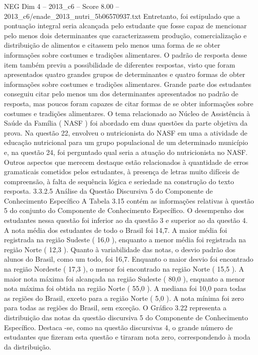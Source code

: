 \begin{textsample}{NEG Dim 4 – 2013\_c6 – Score 8.00 – 2013\_c6/enade\_2013\_nutri\_5b06570937.txt}
Entretanto, foi estipulado que a pontuação integral seria alcançada pelo estudante que fosse capaz de mencionar pelo menos dois determinantes que caracterizassem produção, comercialização e distribuição de alimentos e citassem pelo menos uma forma de se obter informações sobre costumes e tradições alimentares.
O padrão de resposta desse item também previu a possibilidade de diferentes respostas, visto que foram apresentados quatro grandes grupos de determinantes e quatro formas de obter informações sobre costumes e tradições alimentares.
Grande parte dos estudantes conseguiu citar pelo menos um dos determinantes apresentados no padrão de resposta, mas poucos foram capazes de citar formas de se obter informações sobre costumes e tradições alimentares.
O tema relacionado ao Núcleo de Assistência à Saúde da Família ( NASF ) foi abordado em duas questões da parte objetiva da prova.
Na questão 22, envolveu o nutricionista do NASF em uma a atividade de educação nutricional para um grupo populacional de um determinado município e, na questão 24, foi perguntado qual seria a atuação do nutricionista no NASF.
Outros aspectos que merecem destaque estão relacionados à quantidade de erros gramaticais cometidos pelos estudantes, à presença de letras muito difíceis de compreensão, à falta de sequência lógica e seriedade na construção do texto resposta. 3.3.2.5 Análise da Questão Discursiva 5 do Componente de Conhecimento Específico A Tabela 3.15 contém as informações relativas à questão 5 do conjunto do Componente de Conhecimento Específico.
O desempenho dos estudantes nessa questão foi inferior ao da questão 3 e superior ao da questão 4.
A nota média dos estudantes de todo o Brasil foi 14,7.
A maior média foi registrada na região Sudeste ( 16,0 ), enquanto a menor média foi registrada na região Norte ( 12,3 ).
Quanto à variabilidade das notas, o desvio padrão dos alunos do Brasil, como um todo, foi 16,7.
Enquanto o maior desvio foi encontrado na região Nordeste ( 17,3 ), o menor foi encontrado na região Norte ( 15,5 ).
A maior nota máxima foi alcançada na região Sudeste ( 80,0 ), enquanto a menor nota máxima foi obtida na região Norte ( 55,0 ).
A mediana foi 10,0 para todas as regiões do Brasil, exceto para a região Norte ( 5,0 ).
A nota mínima foi zero para todas as regiões do Brasil, sem exceção.
O Gráfico 3.22 representa a distribuição das notas da questão discursiva 5 do Componente de Conhecimento Específico.
Destaca -se, como na questão discursivas 4, o grande número de estudantes que fizeram esta questão e tiraram nota zero, correspondendo à moda da distribuição.

\end{textsample}
